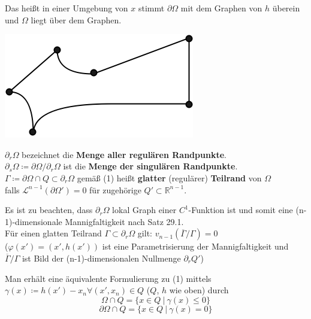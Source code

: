 \begin{definition}
    Das heißt in einer Umgebung von $x$ stimmt $\partial \Omega $ mit dem Graphen von $h$
    überein und $\Omega$ liegt über dem Graphen.
    
    \includegraphics[scale=0.5]{pictures/007-02}
    
    $\partial_r \Omega $ bezeichnet die \textbf{Menge aller regulären Randpunkte}. \\
    $\partial_s \Omega \coloneqq \partial \Omega / \partial_r \Omega $ ist die 
    \textbf{Menge der singulären Randpunkte}. \\
    $\Gamma \coloneqq \partial \Omega \cap Q \subset \partial_r \Omega $
    gemäß (1) heißt \textbf{glatter} (regulärer) \textbf{Teilrand} von $\Omega$ \\
    falls $\mathcal{L}^{n-1} (\partial \Omega') = 0 $
    für zugehörige $Q' \subset \mathbb{R}^{n-1} $.
\end{definition}    
    
Es ist zu beachten, dass $\partial_r \Omega $ lokal Graph einer
$C^1$-Funktion ist und somit eine (n-1)-dimensionale Mannigfaltigkeit nach Satz 29.1. \\
Für einen glatten Teilrand $\Gamma \subset \partial_r \Omega $ gilt:
$v_{n-1} \left(\overline{\Gamma} / \Gamma \right) = 0 $\\
($\varphi \left(x' \right) = \left(x', h\left(x' \right) \right)
$ ist eine Parametrisierung der Mannigfaltigkeit und \\
$\overline{\Gamma} / \Gamma 
$ ist Bild der (n-1)-dimensionalen Nullmenge $
\partial_r Q' $)

Man erhält eine äquivalente Formulierung zu (1) mittels \\
$\gamma(x) \coloneqq h(x') - x_n \forall (x', x_n) \in Q $ ($Q$, $h$ wie oben) durch
\begin{equation*}
    \Omega \cap Q = \lbrace x \in Q \ |\ \gamma(x) \leq 0 \rbrace
\end{equation*}
\begin{equation}
    \partial \Omega \cap Q = \lbrace x \in Q \ |\ \gamma(x) = 0 \rbrace
\end{equation}

